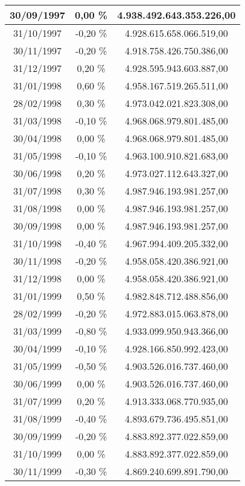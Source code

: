 \begin{center}
\begin{longtable}{|c|c|c|}
30/09/1997 & 0,00 \% & 4.938.492.643.353.226,00  \\ \hline
31/10/1997 & -0,20 \% & 4.928.615.658.066.519,00  \\ \hline
30/11/1997 & -0,20 \% & 4.918.758.426.750.386,00  \\ \hline
31/12/1997 & 0,20 \% & 4.928.595.943.603.887,00  \\ \hline
31/01/1998 & 0,60 \% & 4.958.167.519.265.511,00  \\ \hline
28/02/1998 & 0,30 \% & 4.973.042.021.823.308,00  \\ \hline
31/03/1998 & -0,10 \% & 4.968.068.979.801.485,00  \\ \hline
30/04/1998 & 0,00 \% & 4.968.068.979.801.485,00  \\ \hline
31/05/1998 & -0,10 \% & 4.963.100.910.821.683,00  \\ \hline
30/06/1998 & 0,20 \% & 4.973.027.112.643.327,00  \\ \hline
31/07/1998 & 0,30 \% & 4.987.946.193.981.257,00  \\ \hline
31/08/1998 & 0,00 \% & 4.987.946.193.981.257,00  \\ \hline
30/09/1998 & 0,00 \% & 4.987.946.193.981.257,00  \\ \hline
31/10/1998 & -0,40 \% & 4.967.994.409.205.332,00  \\ \hline
30/11/1998 & -0,20 \% & 4.958.058.420.386.921,00  \\ \hline
31/12/1998 & 0,00 \% & 4.958.058.420.386.921,00  \\ \hline
31/01/1999 & 0,50 \% & 4.982.848.712.488.856,00  \\ \hline
28/02/1999 & -0,20 \% & 4.972.883.015.063.878,00  \\ \hline
31/03/1999 & -0,80 \% & 4.933.099.950.943.366,00  \\ \hline
30/04/1999 & -0,10 \% & 4.928.166.850.992.423,00  \\ \hline
31/05/1999 & -0,50 \% & 4.903.526.016.737.460,00  \\ \hline
30/06/1999 & 0,00 \% & 4.903.526.016.737.460,00  \\ \hline
31/07/1999 & 0,20 \% & 4.913.333.068.770.935,00  \\ \hline
31/08/1999 & -0,40 \% & 4.893.679.736.495.851,00  \\ \hline
30/09/1999 & -0,20 \% & 4.883.892.377.022.859,00  \\ \hline
31/10/1999 & 0,00 \% & 4.883.892.377.022.859,00  \\ \hline
30/11/1999 & -0,30 \% & 4.869.240.699.891.790,00  \\ \hline

\end{longtable}
\end{center}
